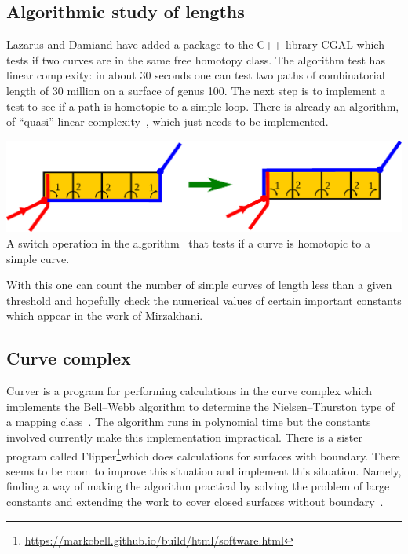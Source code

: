 \documentclass[14pt,fleqn]{article}
\begin{document}
\subsection{Algorithmic study of lengths}

Lazarus and Damiand have
added a package to the C++ library  CGAL which tests if two curves are
in the same free homotopy class. The algorithm test has linear
complexity: in about 30 seconds one can test two paths of
combinatorial length of 30 million on a surface of genus
100. The next step is to implement a test to see if a path
is homotopic to a simple loop. There is already an algorithm, of
“quasi”-linear complexity~\cite{dl-cginc-19}, which just needs to be implemented.
\begin{center}
  \includegraphics[scale=.55]{switch.pdf} \\
  {\small A switch operation in the algorithm~\cite{dl-cginc-19} that tests if a curve is homotopic to a simple curve.}
\end{center}
With
this one can count the number of simple curves of length less than a given threshold 
and hopefully check the numerical values of certain important constants which
appear in the work of Mirzakhani.


\subsection{Curve complex}

Curver is a program for
performing calculations in the curve complex which implements the
Bell–Webb algorithm to determine the Nielsen–Thurston type of a
mapping class~\cite{b-c-17,b-esmt-19}. The algorithm runs in polynomial time but the constants
involved currently make this implementation impractical. There is a
sister program called Flipper\footnote{\url{https://markcbell.github.io/build/html/software.html}}which does calculations for surfaces
with boundary. There seems to be room to improve this situation and
implement this situation. Namely, finding a way of making the
algorithm practical by solving the problem of large constants and
extending the work to cover closed surfaces without boundary~\cite{mm-sosr-19}.
\end{document}
